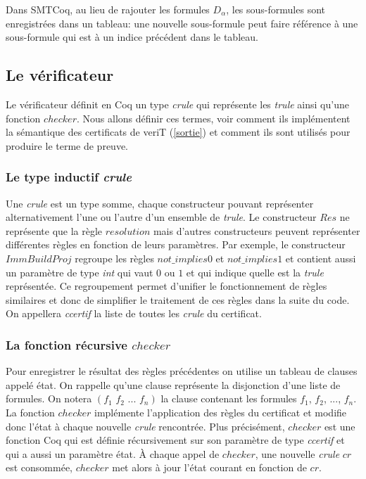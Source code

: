\documentclass[11pt]{article}
\begin{document}
Dans SMTCoq, au lieu de rajouter les formules $D_\alpha$, les sous-formules sont enregistrées dans un tableau: une nouvelle sous-formule peut faire référence à une sous-formule qui est à un indice précédent dans le tableau. 

\subsection{Le vérificateur}

Le vérificateur définit en Coq un type \textit{crule} qui représente les \textit{trule} ainsi qu'une fonction $checker$. Nous allons définir ces termes, voir comment ils implémentent la sémantique des certificats de veriT (\ref{sortie}) et comment ils sont utilisés pour produire le terme de preuve.


\subsubsection{Le type inductif \textit{crule}}\label{regroupement}

Une \textit{crule} est un type somme, chaque constructeur pouvant représenter alternativement l'une ou l'autre d'un ensemble de \textit{trule}. Le constructeur $Res$ ne représente que la règle $resolution$ mais d'autres constructeurs peuvent représenter différentes règles en fonction de leurs paramètres. Par exemple, le constructeur $ImmBuildProj$ regroupe les règles $not\_implies0$ et $not\_implies1$ et contient aussi un paramètre de type \textit{int} qui vaut $0$ ou $1$ et qui indique quelle est la \textit{trule} représentée. Ce regroupement permet d'unifier le fonctionnement de règles similaires et donc de simplifier le traitement de ces règles dans la suite du code. \\

On appellera \textit{ccertif} la liste de toutes les \textit{crule} du certificat.


\subsubsection{La fonction récursive $checker$} \label{checker}

Pour enregistrer le résultat des règles précédentes on utilise un tableau de clauses appelé état. On rappelle qu'une clause représente la disjonction d'une liste de formules. On notera $(f_1 \,\, f_2\,\,  ... \,\, f_n)$ la clause contenant les formules $f_1$, $f_2$, ..., $f_n$. La fonction $checker$ implémente l'application des règles du certificat et modifie donc l'état à chaque nouvelle \textit{crule} rencontrée. Plus précisément, $checker$ est une fonction Coq qui est définie récursivement sur son paramètre de type \textit{ccertif} et qui a aussi un paramètre état. À chaque appel de $checker$, une nouvelle \textit{crule} $cr$ est consommée, $checker$ met alors à jour l'état courant en fonction de $cr$.\\
\end{document}
